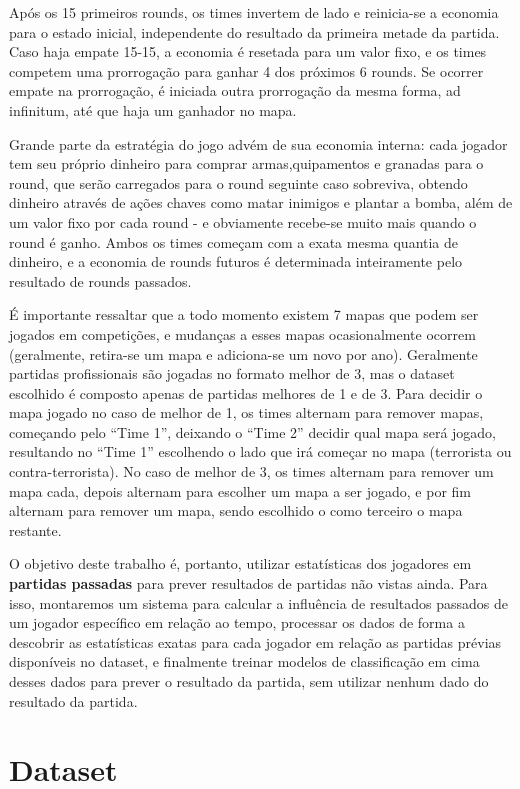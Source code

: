 \documentclass[12pt]{article}
\begin{document}
Após os 15 primeiros rounds, os times invertem de lado e reinicia-se a economia para o estado inicial, independente do resultado da primeira metade da partida. Caso haja empate 15-15, a economia é resetada para um valor fixo, e os times competem uma prorrogação para ganhar 4 dos próximos 6 rounds. Se ocorrer empate na prorrogação, é iniciada outra prorrogação da mesma forma, ad infinitum, até que haja um ganhador no mapa.

Grande parte da estratégia do jogo advém de sua economia interna: cada jogador tem seu próprio dinheiro para comprar armas,quipamentos e granadas para o round, que serão carregados para o round seguinte caso sobreviva, obtendo dinheiro através de ações chaves como matar inimigos e plantar a bomba, além de um valor fixo por cada round - e obviamente recebe-se muito mais quando o round é ganho. Ambos os times começam com a exata mesma quantia de dinheiro, e a economia de rounds futuros é determinada inteiramente pelo resultado de rounds passados.

É importante ressaltar que a todo momento existem 7 mapas que podem ser jogados em competições, e mudanças a esses mapas ocasionalmente ocorrem (geralmente, retira-se um mapa e adiciona-se um novo por ano). Geralmente partidas profissionais são jogadas no formato melhor de 3, mas o dataset escolhido é composto apenas de partidas melhores de 1 e de 3. Para decidir o mapa jogado no caso de melhor de 1, os times alternam para remover mapas, começando pelo ``Time 1'', deixando o ``Time 2'' decidir qual mapa será jogado, resultando no ``Time 1'' escolhendo o lado que irá começar no mapa (terrorista ou contra-terrorista). No caso de melhor de 3, os times alternam para remover um mapa cada, depois alternam para escolher um mapa a ser jogado, e por fim alternam para remover um mapa, sendo escolhido o como terceiro o mapa restante.

O objetivo deste trabalho é, portanto, utilizar estatísticas dos jogadores em \textbf{partidas passadas} para prever resultados de partidas não vistas ainda. Para isso, montaremos um sistema para calcular a influência de resultados passados de um jogador específico em relação ao tempo, processar os dados de forma a descobrir as estatísticas exatas para cada jogador em relação as partidas prévias disponíveis no dataset, e finalmente treinar modelos de classificação em cima desses dados para prever o resultado da partida, sem utilizar nenhum dado do resultado da partida.

\section{Dataset}
\end{document}
